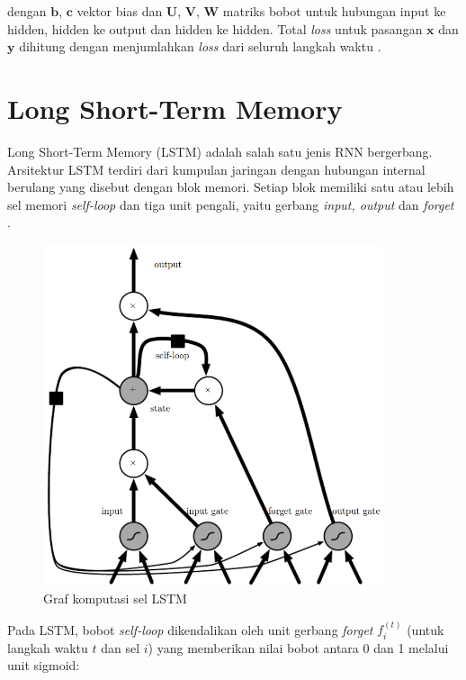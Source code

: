 \noindent
dengan $\pmb{b}$, $\pmb{c}$ vektor bias dan $\pmb{U}$, $\pmb{V}$, $\pmb{W}$ matriks bobot untuk hubungan input ke hidden, hidden ke output dan hidden ke hidden. Total \textit{loss} untuk pasangan $\pmb{x}$ dan $\pmb{y}$ dihitung dengan menjumlahkan \textit{loss} dari seluruh langkah waktu \citep{goodfellow-2016}.



\section{Long Short-Term Memory}
Long Short-Term Memory (LSTM) adalah salah satu jenis RNN bergerbang. Arsitektur LSTM terdiri dari kumpulan jaringan dengan hubungan internal berulang yang disebut dengan blok memori. Setiap blok memiliki satu atau lebih sel memori \textit{self-loop} dan tiga unit pengali, yaitu gerbang \textit{input, output} dan \textit{forget} \citep{graves-2012}.

\begin{figure}
    \centering
    \includegraphics[width=10cm]{gambar/landasan-teori/lstm.png}
    \caption{Graf komputasi sel LSTM \citep{goodfellow-2016}}
    \label{gambar:lstm}
\end{figure}

Pada LSTM, bobot \textit{self-loop} dikendalikan oleh unit gerbang \textit{forget} $f_{i}^{(t)}$ (untuk langkah waktu $t$ dan sel $i$) yang memberikan nilai bobot antara 0 dan 1 melalui unit sigmoid:

